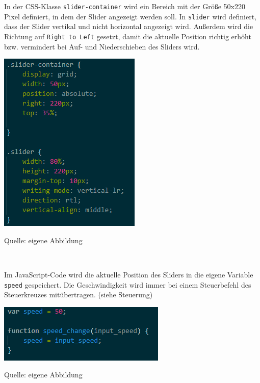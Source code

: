 \documentclass[ngerman,12pt,a4paper]{article}
\begin{document}
	In der CSS-Klasse \texttt{slider-container} wird ein Bereich mit der Größe 50x220 Pixel definiert, in dem der Slider angezeigt werden soll. In \texttt{slider} wird definiert, dass der Slider vertikal und nicht horizontal angezeigt wird. Außerdem wird die Richtung auf \texttt{Right to Left} gesetzt, damit die aktuelle Position richtig erhöht bzw. vermindert bei Auf- und Niederschieben des Sliders wird. \\
	\begin{center}
		\begin{minipage}[t]{0.45\textwidth}
			\includegraphics{Pictures/speed-css}
			\label{fig:speed-css}
			\vspace{-10pt}
			\begin{center}
				\par\small Quelle: eigene Abbildung 
			\end{center}
		\end{minipage} \\[0.75cm]
	\end{center}
	Im JavaScript-Code wird die aktuelle Position des Sliders in die eigene Variable \texttt{speed} gespeichert. Die Geschwindigkeit wird immer bei einem Steuerbefehl des Steuerkreuzes mitübertragen. (siehe Steuerung)
	\begin{center}
		\begin{minipage}[t]{0.55\textwidth}
			\includegraphics{Pictures/speed-js}
			\label{fig:speed-js}
			\vspace{-10pt}
			\begin{center}
				\par\small Quelle: eigene Abbildung 
			\end{center}
		\end{minipage} \\[0.75cm]
	\end{center}
				
\end{document}
